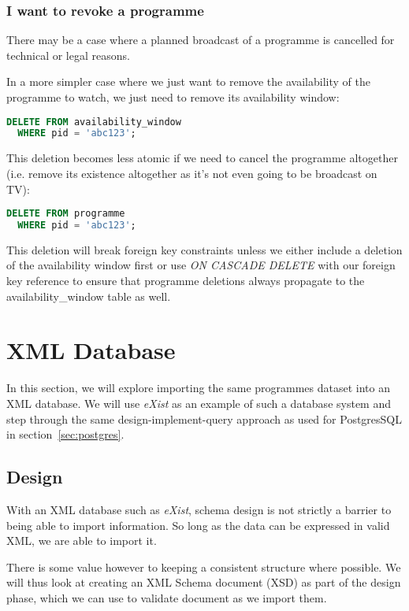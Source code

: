 \documentclass[11pt,a4paper]{article}
\begin{document}
\subsubsection{I want to revoke a programme}

There may be a case where a planned broadcast of a programme is
cancelled for technical or legal reasons.

In a more simpler case where we just want to remove the availability of
the programme to watch, we just need to remove its availability window:

\begin{lstlisting}[language=SQL]
  DELETE FROM availability_window
  WHERE pid = 'abc123';
\end{lstlisting}

This deletion becomes less atomic if we need to cancel the programme
altogether (i.e. remove its existence altogether as it's not
even going to be broadcast on TV):

\begin{lstlisting}[language=SQL]
  DELETE FROM programme
  WHERE pid = 'abc123';
\end{lstlisting}

This deletion will break foreign key constraints unless we either
include a deletion of the availability window first or use
\emph{ON CASCADE DELETE} with our foreign key reference to ensure
that programme deletions always propagate to the
availability\_window table as well.

\section{XML Database}

In this section, we will explore importing the same programmes dataset
into an XML database. We will use \emph{eXist} as an example of such
a database system and step through the same design-implement-query
approach as used for PostgresSQL in section~\ref{sec:postgres}.

\subsection{Design}

With an XML database such as \emph{eXist}, schema design is not strictly
a barrier to being able to import information. So long as the data can
be expressed in valid XML, we are able to import it.

There is some value however to keeping a consistent structure where possible.
We will thus look at creating
an XML Schema document (XSD) as part of the design phase, which we can
use to validate document as we import them.
\end{document}
